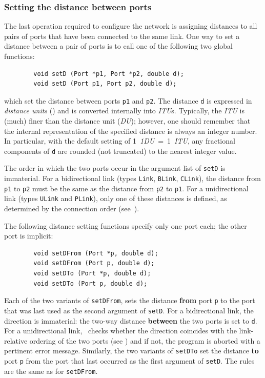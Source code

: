 \subsubsection{Setting the distance between ports}
\label{rm_to_po_se}

The last operation required to configure the network is assigning
distances to all pairs of ports that have been connected to the same
link.
One way to set a distance between a pair of ports is to call one of the
following two global functions:
\begin{verbatim}
        void setD (Port *p1, Port *p2, double d);
        void setD (Port p1, Port p2, double d);
\end{verbatim}
which set the distance between ports {\tt p1} and {\tt p2}.
The distance {\tt d} is expressed in {\em distance units\/}
() and is converted internally into {\em ITU\/}s.
Typically, the {\em ITU\/} is (much) finer than the distance unit ({\em DU\/});
however, one should remember that the internal representation of the
specified distance is always an integer number.
In particular, with the default setting of 1~{\em 1DU\/}~=~1~{\em ITU},
any fractional
components of {\tt d} are rounded (not truncated) to the nearest integer
value.

The order in which the two ports occur in the argument list of {\tt setD}
is immaterial.
For a bidirectional link (types {\tt Link}, {\tt BLink}, {\tt CLink}), 
the distance from {\tt p1} to {\tt p2} must be the same as the distance
from {\tt p2} to {\tt p1}.
For a unidirectional link (types {\tt ULink} and {\tt PLink}), only one of
these distances is defined, as
determined by the connection order (see~).

The following distance setting functions specify only one port each; the other
port is implicit:
\begin{verbatim}
        void setDFrom (Port *p, double d);
        void setDFrom (Port p, double d);
        void setDTo (Port *p, double d);
        void setDTo (Port p, double d);
\end{verbatim}

Each of the two variants of {\tt setDFrom}, sets the distance {\bf from} port
{\tt p} to the port that was last used as the second argument of {\tt setD}.
For a bidirectional link, the direction is immaterial: the two-way distance
{\bf between} the two ports is set to {\tt d}.
For a unidirectional link, \smurph\ checks whether the direction coincides
with the link-relative ordering of the two ports (see )
and if not, the program is aborted with a pertinent error message.
Similarly, the two variants of {\tt setDTo} set the distance {\bf to} port
{\tt p} from the port that last occurred as the first argument of {\tt setD}.
The rules are the same as for {\tt setDFrom}.

